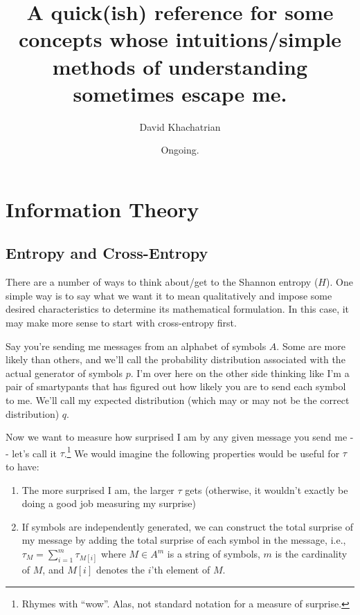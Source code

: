 \documentclass[letterpaper,12pt]{report}
\providecommand{\tightlist}{%
  \setlength{\itemsep}{0pt}\setlength{\parskip}{0pt}}
\begin{document}
\title{A quick(ish) reference for some concepts whose
 intuitions/simple methods of understanding sometimes escape me.}
\author{David Khachatrian}
\date{Ongoing.}

\maketitle

\newpage


\tableofcontents

\newpage


\chapter{Information Theory}\label{information-theory}

\section{Entropy and Cross-Entropy}\label{entropy-and-cross-entropy}

There are a number of ways to think about/get to the Shannon entropy
(\(H\)). One simple way is to say what we want
it to mean qualitatively and impose some desired characteristics to
determine its mathematical formulation. In this case, it may make more
sense to start with cross-entropy first.

Say you're sending me messages from an alphabet of symbols \(A\). Some
are more likely than others, and we'll call the probability distribution
associated with the actual generator of symbols \(p\). I'm over here on
the other side thinking like I'm a pair of smartypants that
has figured out how likely you are to send each symbol to me. We'll call
my expected distribution (which may or may not be the correct
distribution) \(q\).

Now we want to measure how surprised I am by any given message you send
me -\/- let's call it \(\tau\).\footnote{
    Rhymes with ``wow''. 
    Alas, not standard notation for a measure of surprise.
    }
We would imagine the following properties would be useful for \(\tau\) to have:
\begin{enumerate}
  \tightlist
  \item
    The more surprised I am, the larger
    \(\tau\) gets (otherwise, it wouldn't exactly be doing a good job
    measuring my surprise) 
  \item
    If symbols are independently generated, we can
    construct the total surprise of my message by adding the total surprise
    of each symbol in the message, i.e.,
    \(\tau_{M} = \sum_{i=1}^{m} \tau_{M[i]}\) where \(M \in A^m\) is a
    string of symbols, \(m\) is the cardinality of \(M\), and \(M[i]\)
    denotes the \(i\)'th element of \(M\).
\end{enumerate}
\end{document}
